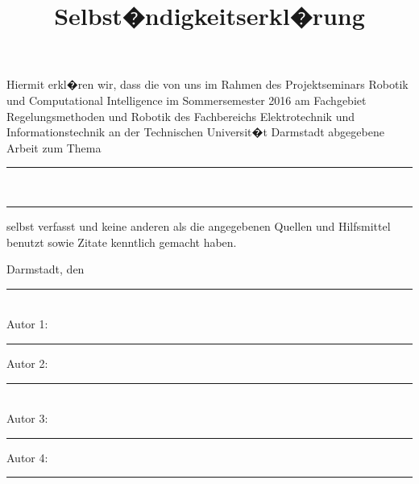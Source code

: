 \documentclass[journal,final,a4paper,onecolumn]{PS}
\begin{document}
\headsep 40pt
\title{Selbst�ndigkeitserkl�rung}

\maketitle

\large

\noindent 
Hiermit erkl�ren wir, dass die von uns im Rahmen des Projektseminars Robotik und Computational Intelligence im Sommersemester 2016
am Fachgebiet Regelungsmethoden und Robotik des Fachbereichs Elektrotechnik und Informationstechnik an der Technischen Universit�t Darmstadt abgegebene Arbeit zum Thema

\vspace{1cm}
\noindent
\rule{\textwidth}{0.8pt}
\\[4mm]
\noindent
\rule{\textwidth}{0.8pt}
\vspace{1cm}

\noindent selbst verfasst und keine anderen als die angegebenen Quellen und Hilfsmittel benutzt sowie Zitate kenntlich gemacht haben.

\vspace{1cm}

\noindent 
Darmstadt, den \rule{3cm}{0.8pt} \\[2\baselineskip]

Autor 1: \rule{6cm}{0.8pt} \hspace{2cm} Autor 2: \rule{6cm}{0.8pt} \\[2\baselineskip]

Autor 3: \rule{6cm}{0.8pt} \hspace{2cm} Autor 4: \rule{6cm}{0.8pt}
\end{document}
